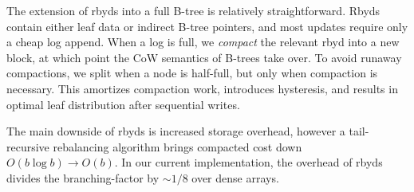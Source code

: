\documentclass[letterpaper,twocolumn,10pt]{article}
\begin{document}
The extension of rbyds into a full B-tree is relatively straightforward.
Rbyds contain either leaf data or indirect B-tree pointers, and most
updates require only a cheap log append. When a log is full, we \emph{compact}
the relevant rbyd into a new block, at which point the CoW
semantics of B-trees take over.
To avoid runaway compactions, we split when a node is half-full, but
only when compaction is necessary.
This
amortizes compaction work,
introduces hysteresis, and results in
optimal
leaf distribution after
sequential writes.


The main downside of rbyds is increased storage overhead, however a
tail-recursive rebalancing algorithm brings compacted cost down
$O(b \log b) \rightarrow O(b)$.
In our current implementation, the overhead of rbyds divides the
branching-factor by ${\sim}1/8$ over dense arrays.



%
%
%
%
\end{document}
